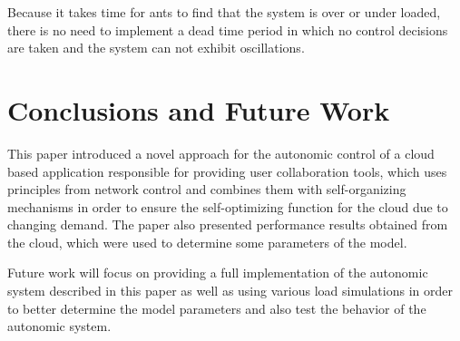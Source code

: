 \documentclass{sig-alternate}
\begin{document}
Because it takes time for ants to find that the system is over or under loaded, there is no need to implement a dead time period in which no control decisions are taken and the system can not exhibit oscillations. 

\section{Conclusions and Future Work} 
\label{sec:conclusion}

This paper introduced a novel approach for the autonomic control of a cloud based application responsible for providing user collaboration tools, which uses principles from network control and combines them with self-organizing mechanisms in order to ensure the self-optimizing function for the cloud due to changing demand. The paper also presented performance results obtained from the cloud, which were used to determine some parameters of the model.

Future work will focus on providing a full implementation of the autonomic system described in this paper as well as using various load simulations in order to better determine the model parameters and also test the behavior of the autonomic system.

\end{document}
